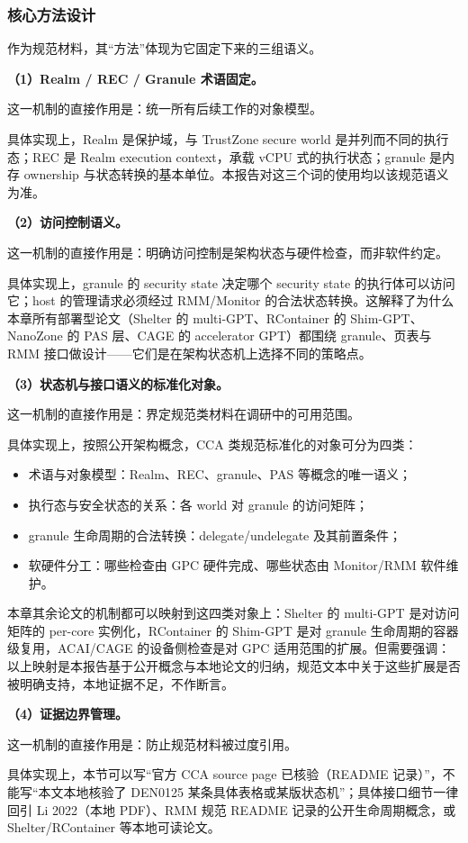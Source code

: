 \documentclass[11pt]{ctexart}
\begin{document}
\subsubsection{核心方法设计}
作为规范材料，其“方法”体现为它固定下来的三组语义。\par
\noindent\textbf{（1）Realm / REC / Granule 术语固定。}\par
这一机制的直接作用是：统一所有后续工作的对象模型。\par
具体实现上，Realm 是保护域，与 TrustZone secure world 是并列而不同的执行态；REC 是 Realm execution context，承载 vCPU 式的执行状态；granule 是内存 ownership 与状态转换的基本单位。本报告对这三个词的使用均以该规范语义为准。\par
\noindent\textbf{（2）访问控制语义。}\par
这一机制的直接作用是：明确访问控制是架构状态与硬件检查，而非软件约定。\par
具体实现上，granule 的 security state 决定哪个 security state 的执行体可以访问它；host 的管理请求必须经过 RMM/Monitor 的合法状态转换。这解释了为什么本章所有部署型论文（Shelter 的 multi-GPT、RContainer 的 Shim-GPT、NanoZone 的 PAS 层、CAGE 的 accelerator GPT）都围绕 granule、页表与 RMM 接口做设计——它们是在架构状态机上选择不同的策略点。\par
\noindent\textbf{（3）状态机与接口语义的标准化对象。}\par
这一机制的直接作用是：界定规范类材料在调研中的可用范围。\par
具体实现上，按照公开架构概念，CCA 类规范标准化的对象可分为四类：
\begin{itemize}
\item 术语与对象模型：Realm、REC、granule、PAS 等概念的唯一语义；
\item 执行态与安全状态的关系：各 world 对 granule 的访问矩阵；
\item granule 生命周期的合法转换：delegate/undelegate 及其前置条件；
\item 软硬件分工：哪些检查由 GPC 硬件完成、哪些状态由 Monitor/RMM 软件维护。
\end{itemize}
本章其余论文的机制都可以映射到这四类对象上：Shelter 的 multi-GPT 是对访问矩阵的 per-core 实例化，RContainer 的 Shim-GPT 是对 granule 生命周期的容器级复用，ACAI/CAGE 的设备侧检查是对 GPC 适用范围的扩展。但需要强调：以上映射是本报告基于公开概念与本地论文的归纳，规范文本中关于这些扩展是否被明确支持，本地证据不足，不作断言。\par
\noindent\textbf{（4）证据边界管理。}\par
这一机制的直接作用是：防止规范材料被过度引用。\par
具体实现上，本节可以写“官方 CCA source page 已核验（README 记录）”，不能写“本文本地核验了 DEN0125 某条具体表格或某版状态机”；具体接口细节一律回引 Li 2022（本地 PDF）、RMM 规范 README 记录的公开生命周期概念，或 Shelter/RContainer 等本地可读论文。\par
\end{document}

